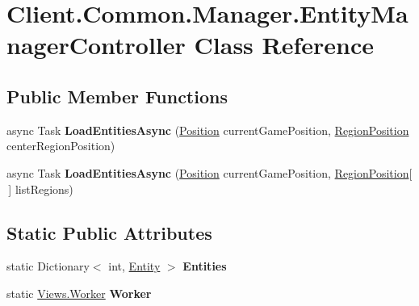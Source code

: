 \hypertarget{classClient_1_1Common_1_1Manager_1_1EntityManagerController}{\section{Client.\-Common.\-Manager.\-Entity\-Manager\-Controller Class Reference}
\label{classClient_1_1Common_1_1Manager_1_1EntityManagerController}
}
\subsection*{Public Member Functions}
\begin{DoxyCompactItemize}
\item 
\hypertarget{classClient_1_1Common_1_1Manager_1_1EntityManagerController_a57ee1673b8f32ca6b3ba5b67e75e3191}{async Task {\bfseries Load\-Entities\-Async} (\hyperlink{classCore_1_1Models_1_1Position}{Position} current\-Game\-Position, \hyperlink{classCore_1_1Models_1_1RegionPosition}{Region\-Position} center\-Region\-Position)}\label{classClient_1_1Common_1_1Manager_1_1EntityManagerController_a57ee1673b8f32ca6b3ba5b67e75e3191}

\item 
\hypertarget{classClient_1_1Common_1_1Manager_1_1EntityManagerController_ac9b8071837dbfa6df3b8dca7480313ad}{async Task {\bfseries Load\-Entities\-Async} (\hyperlink{classCore_1_1Models_1_1Position}{Position} current\-Game\-Position, \hyperlink{classCore_1_1Models_1_1RegionPosition}{Region\-Position}\mbox{[}$\,$\mbox{]} list\-Regions)}\label{classClient_1_1Common_1_1Manager_1_1EntityManagerController_ac9b8071837dbfa6df3b8dca7480313ad}

\end{DoxyCompactItemize}
\subsection*{Static Public Attributes}
\begin{DoxyCompactItemize}
\item 
\hypertarget{classClient_1_1Common_1_1Manager_1_1EntityManagerController_a4d004f01cfe23659536915ccd16b3b3c}{static Dictionary$<$ int, \hyperlink{classCore_1_1Models_1_1Entity}{Entity} $>$ {\bfseries Entities}}\label{classClient_1_1Common_1_1Manager_1_1EntityManagerController_a4d004f01cfe23659536915ccd16b3b3c}

\item 
\hypertarget{classClient_1_1Common_1_1Manager_1_1EntityManagerController_a74732f76282fe3e9ed972dd93d3b6930}{static \hyperlink{classClient_1_1Common_1_1Views_1_1Worker}{Views.\-Worker} {\bfseries Worker}}\label{classClient_1_1Common_1_1Manager_1_1EntityManagerController_a74732f76282fe3e9ed972dd93d3b6930}

\end{DoxyCompactItemize}
